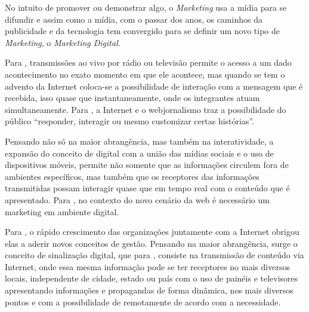 

No intuito de promover ou demonstrar algo, o \textit{Marketing} usa a mídia para se difundir e assim como a mídia, com o passar dos anos, os caminhos da publicidade e da tecnologia tem  convergido para se definir um novo tipo de \textit{Marketing}, o \textit{Marketing Digital}.



Para \cite[p.4]{escobar2007}, transmissões ao vivo por rádio ou televisão permite o acesso a um dado acontecimento no exato momento em que ele acontece, mas quando se tem o advento da Internet coloca-se a possibilidade de interação com a mensagem que é recebida, isso quase que instantaneamente, onde os integrantes atuam simultaneamente. Para \cite{deuze2002}, a Internet e o webjornalismo traz a possibilidade do público ``responder, interagir ou mesmo customizar certas histórias''. 





Pensando não só na maior abrangência, mas também na interatividade, a expansão do conceito de  digital com a união das mídias sociais e o uso de dispositivos móveis, permite não somente que as informações circulem fora de ambientes específicos, mas também que os receptores das informações transmitidas possam interagir quase que em tempo real com o conteúdo que é apresentado. Para \cite{santos2014}, no contexto do novo cenário da web é necessário um marketing em ambiente digital.

Para \cite[p.7]{machado2010}, o rápido crescimento das organizações juntamente com a Internet obrigou elas a aderir novos conceitos de gestão. Pensando na maior abrangência, surge o conceito de sinalização digital, que para \cite[p.37]{machado2010}, consiste na transmissão de conteúdo via Internet, onde essa mesma informação pode se ter receptores no mais diversos locais, independente de cidade, estado ou país com o uso de painéis e televisores apresentando informações e propagandas de forma dinâmica, nos mais diversos pontos e com a possibilidade de  remotamente de acordo com a necessidade. 

